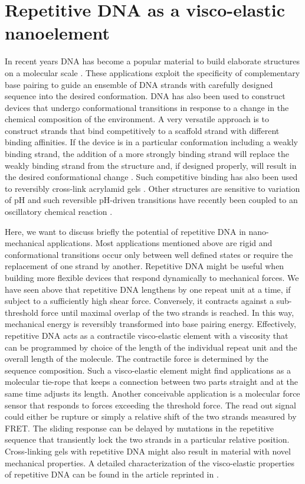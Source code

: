 \section{\label{sec:nanomechanical_app}Repetitive DNA as a visco-elastic nanoelement}
In recent years DNA has become a popular material to build elaborate structures on a molecular scale
\cite{Seeman_Nature_03, Shih_Nature_04, Rothemund_Nature_06}. These applications exploit the
specificity of complementary base pairing to guide an ensemble of DNA strands with carefully designed
sequence into the desired conformation. DNA has also been used
to construct devices that undergo conformational transitions in response to a change in the
chemical composition of the environment. A very versatile approach is to construct strands that
bind competitively to a scaffold strand with different binding affinities. If the device is in a particular
conformation including a weakly binding strand, the addition of a more strongly binding strand 
will replace the weakly binding strand from the structure and, if designed properly, will result in the 
desired conformational change  \cite{Simmel_AppPhysLett_02}. Such competitive binding has also 
been used to reversibly cross-link acrylamid gels \cite{Lin_04}. Other structures are sensitive 
to variation of pH and such reversible pH-driven transitions have recently been coupled to an oscillatory
chemical reaction \cite{Liu_AngwChemie_03,Liedl_NanoLett_05}.

Here, we want to discuss briefly the potential of repetitive DNA in nano-mechanical applications.
Most applications mentioned above are rigid and conformational transitions occur only between 
well defined states or require the replacement of one strand by another. Repetitive DNA
might be useful when building more flexible devices that respond dynamically to mechanical forces. 
We have seen above that repetitive DNA lengthens by one repeat unit at a time, if subject to a 
sufficiently high shear force. Conversely, it contracts against a sub-threshold force until maximal
overlap of the two strands is reached. In this way, mechanical energy is reversibly transformed into
base pairing energy. Effectively, repetitive DNA acts as a contractile visco-elastic
element with a viscosity that can be programmed by choice of the length of the individual
repeat unit and the overall length of the molecule. The contractile force is determined by the
sequence composition. Such a visco-elastic element might find applications as a molecular tie-rope
that keeps a connection between two parts straight and at the same time adjusts its length. 
Another conceivable application is a molecular force sensor that responds to forces exceeding 
the threshold force. The read out signal could either be rupture or simply a relative
shift of the two strands measured by FRET. 
The sliding response can be delayed by mutations in the repetitive sequence that transiently
lock the two strands in a particular relative position. Cross-linking
 gels with repetitive DNA might also result in material with novel mechanical properties. 
A detailed characterization of the visco-elastic properties of repetitive DNA can be found
in the article reprinted in  \cite{Neher_BioPhysJ_05}.


